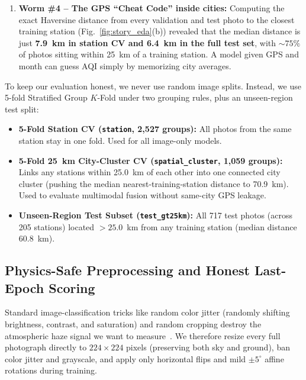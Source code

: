\documentclass[conference]{IEEEtran}
\begin{document}
\begin{enumerate}
        validation AQI standard deviation jumps to 108.20 (vs.\ 79.34--88.38 on
        Folds 0, 1, 2, and 4), causing every model's error to spike by 15--20
        points on Fold~3.
  \item \textbf{Worm \#4 -- The GPS ``Cheat Code'' inside cities:} Computing the
        exact Haversine distance from every validation and test photo to the
        closest training station (Fig.~\ref{fig:story_eda}(b)) revealed that the
        median distance is just \textbf{7.9~km in station CV and 6.4~km in the
        full test set}, with $\sim 75\%$ of photos sitting within 25~km of a
        training station. A model given GPS and month can guess AQI simply by
        memorizing city averages.
\end{enumerate}

To keep our evaluation honest, we never use random image splits. Instead, we use
5-fold Stratified Group $K$-Fold under two grouping rules, plus an unseen-region
test split:
\begin{itemize}
  \item \textbf{5-Fold Station CV (\texttt{station}, 2,527 groups):} All photos
        from the same station stay in one fold. Used for all image-only models.
  \item \textbf{5-Fold 25~km City-Cluster CV (\texttt{spatial\_cluster}, 1,059
        groups):} Links any stations within 25.0~km of each other into one
        connected city cluster (pushing the median nearest-training-station
        distance to 70.9~km). Used to evaluate multimodal fusion without
        same-city GPS leakage.
  \item \textbf{Unseen-Region Test Subset (\texttt{test\_gt25km}):} All 717 test
        photos (across 205 stations) located $> 25.0$~km from any training
        station (median distance 60.8~km).
\end{itemize}

\subsection{Physics-Safe Preprocessing and Honest Last-Epoch Scoring}
\label{subsec:preprocessing_and_scoring}

Standard image-classification tricks like random color jitter (randomly shifting
brightness, contrast, and saturation) and random cropping destroy the
atmospheric haze signal we want to measure~\cite{wangLightweightAirQuality2024,
bylerLocationGeneralizabilityImageBased2025}. We therefore resize every full
photograph directly to $224 \times 224$ pixels (preserving both sky and ground),
ban color jitter and grayscale, and apply only horizontal flips and mild
$\pm 5^\circ$ affine rotations during training.
\end{document}

